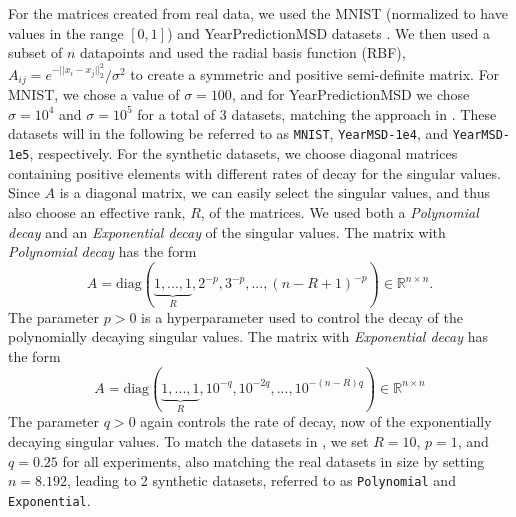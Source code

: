 \documentclass{article}
\theoremstyle{definition}
\begin{document}
For the matrices created from real data, we used the MNIST (normalized to have
values in the range $[0,1]$) and YearPredictionMSD datasets \cite{726791,
Bertin-Mahieux2011}. We then used a subset of $n$ datapoints and used the radial
basis function (RBF), $A_{ij}=e^{-||x_i-x_j||_2^2}/{\sigma^2}$ to create a
symmetric and positive semi-definite matrix. For MNIST, we chose a value of
$\sigma=100$, and for YearPredictionMSD we chose $\sigma=10^4$ and $\sigma=10^5$
for a total of 3 datasets, matching the approach in \cite{balabanov2022}. These
datasets will in the following be referred to as \texttt{MNIST},
\texttt{YearMSD-1e4}, and \texttt{YearMSD-1e5}, respectively. \newline
For the synthetic datasets, we choose diagonal matrices containing positive
elements with different rates of decay for the singular values. Since $A$ is a
diagonal matrix, we can easily select the singular values, and thus also choose
an effective rank, $R$, of the matrices. We used both a \textit{Polynomial
decay} and an \textit{Exponential decay} of the singular values. The matrix with
\textit{Polynomial decay} has the form\\
\begin{equation*}
A=\text{diag}(\underbrace{1,...,1}_R,2^{-p}, 3^{-p}, ..., (n-R+1)^{-p})\in\mathbb{R}^{n\times n}.
\end{equation*}
The parameter $p>0$ is a hyperparameter used to control the decay of the
polynomially decaying singular values. The matrix with \textit{Exponential
decay} has the form
\begin{equation*}
A=\text{diag}(\underbrace{1,...,1}_R,10^{-q}, 10^{-2q}, ..., 10^{-(n-R)q})\in\mathbb{R}^{n\times n}
\end{equation*}
The parameter $q>0$ again controls the rate of decay, now of the exponentially
decaying singular values. To match the datasets in \cite{tropp2017fixedrank}, we
set $R=10$, $p=1$, and $q=0.25$ for all experiments, also matching the real
datasets in size by setting $n=8.192$, leading to 2 synthetic datasets, referred
to as \texttt{Polynomial} and \texttt{Exponential}.
\end{document}
